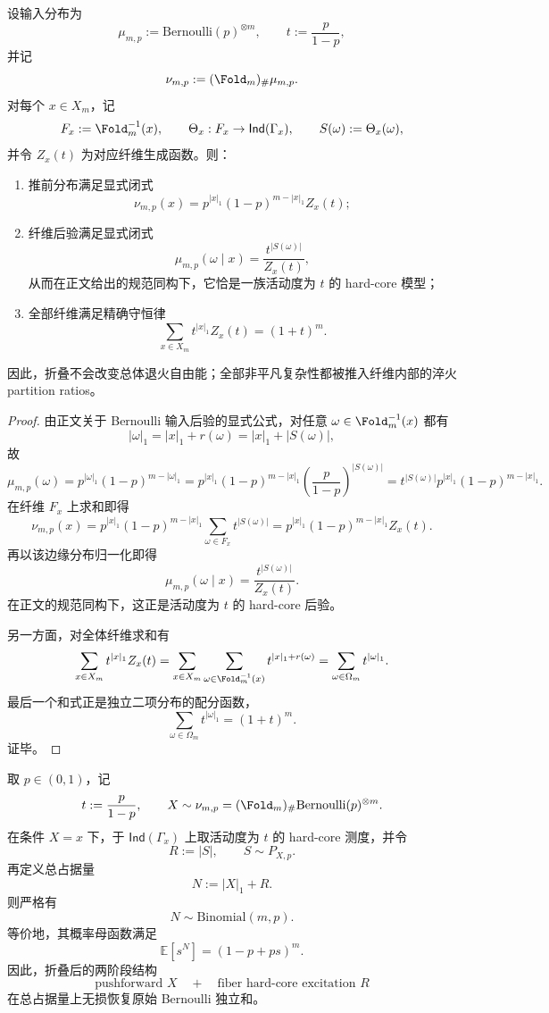 \begin{theorem}\label{thm:conclusion-fold-fiber-hardcore-annealed-conservation}
设输入分布为
\[
\mu_{m,p}:=\mathrm{Bernoulli}(p)^{\otimes m},
\qquad
t:=\frac{p}{1-p},
\]
并记
\[
\nu_{m,p}:=(\Fold_m)_\#\mu_{m,p}.
\]
对每个 \(x\in X_m\)，记
\[
F_x:=\Fold_m^{-1}(x),\qquad
\Theta_x:F_x\to \mathsf{Ind}(\Gamma_x),
\qquad
S(\omega):=\Theta_x(\omega),
\]
并令 \(Z_x(t)\) 为对应纤维生成函数。则：
\begin{enumerate}
  \item 推前分布满足显式闭式
  \[
  \nu_{m,p}(x)=p^{|x|_1}(1-p)^{m-|x|_1}Z_x(t);
  \]
  \item 纤维后验满足显式闭式
  \[
  \mu_{m,p}(\omega\mid x)=\frac{t^{|S(\omega)|}}{Z_x(t)},
  \]
  从而在正文给出的规范同构下，它恰是一族活动度为 \(t\) 的 hard-core 模型；
  \item 全部纤维满足精确守恒律
  \[
  \boxed{\;
  \sum_{x\in X_m} t^{|x|_1}Z_x(t)=(1+t)^m.\;}
  \]
\end{enumerate}
因此，折叠不会改变总体退火自由能；全部非平凡复杂性都被推入纤维内部的淬火 partition ratios。
\end{theorem}
\begin{proof}
由正文关于 Bernoulli 输入后验的显式公式，对任意 \(\omega\in\Fold_m^{-1}(x)\) 都有
\[
|\omega|_1=|x|_1+r(\omega)=|x|_1+|S(\omega)|,
\]
故
\[
\mu_{m,p}(\omega)
=
p^{|\omega|_1}(1-p)^{m-|\omega|_1}
=
p^{|x|_1}(1-p)^{m-|x|_1}
\left(\frac{p}{1-p}\right)^{|S(\omega)|}
=
t^{|S(\omega)|}p^{|x|_1}(1-p)^{m-|x|_1}.
\]
在纤维 \(F_x\) 上求和即得
\[
\nu_{m,p}(x)=p^{|x|_1}(1-p)^{m-|x|_1}\sum_{\omega\in F_x}t^{|S(\omega)|}
=p^{|x|_1}(1-p)^{m-|x|_1}Z_x(t).
\]
再以该边缘分布归一化即得
\[
\mu_{m,p}(\omega\mid x)=\frac{t^{|S(\omega)|}}{Z_x(t)}.
\]
在正文的规范同构下，这正是活动度为 \(t\) 的 hard-core 后验。

另一方面，对全体纤维求和有
\[
\sum_{x\in X_m} t^{|x|_1}Z_x(t)
=
\sum_{x\in X_m}\sum_{\omega\in \Fold_m^{-1}(x)} t^{|x|_1+r(\omega)}
=
\sum_{\omega\in\Omega_m} t^{|\omega|_1}.
\]
最后一个和式正是独立二项分布的配分函数，
\[
\sum_{\omega\in\Omega_m} t^{|\omega|_1}=(1+t)^m.
\]
证毕。
\end{proof}

\begin{theorem}\label{thm:conclusion-fold-fiber-hardcore-exact-binomial-recovery}
取 \(p\in(0,1)\)，记
\[
t:=\frac{p}{1-p},
\qquad
X\sim \nu_{m,p}=(\Fold_m)_\#\mathrm{Bernoulli}(p)^{\otimes m}.
\]
在条件 \(X=x\) 下，于 \(\mathsf{Ind}(\Gamma_x)\) 上取活动度为 \(t\) 的 hard-core 测度，并令
\[
R:=|S|,
\qquad
S\sim P_{X,p}.
\]
再定义总占据量
\[
N:=|X|_1+R.
\]
则严格有
\[
N\sim \mathrm{Binomial}(m,p).
\]
等价地，其概率母函数满足
\[
\mathbb E[s^N]=(1-p+ps)^m.
\]
因此，折叠后的两阶段结构
\[
\text{pushforward }X \quad+\quad \text{fiber hard-core excitation }R
\]
在总占据量上无损恢复原始 Bernoulli 独立和。
\end{theorem}

